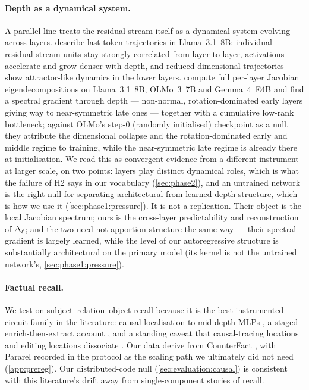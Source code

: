 \paragraph{Depth as a dynamical system.}
A parallel line treats the residual stream itself as a dynamical system
evolving across layers. \citet{fernando2025transformer} describe last-token
trajectories in Llama~3.1~8B: individual residual-stream units stay strongly
correlated from layer to layer, activations accelerate and grow denser with
depth, and reduced-dimensional trajectories show attractor-like dynamics in
the lower layers. \citet{fernando2026dynamics} compute full per-layer Jacobian
eigendecompositions on Llama~3.1~8B, OLMo~3~7B and Gemma~4~E4B and find a
spectral gradient through depth --- non-normal, rotation-dominated early
layers giving way to near-symmetric late ones --- together with a cumulative
low-rank bottleneck; against OLMo's step-0 (randomly initialised) checkpoint
as a null, they attribute the dimensional collapse and the rotation-dominated
early and middle regime to training, while the near-symmetric late regime is
already there at initialisation. We read this as convergent evidence from a
different instrument at larger scale, on two points: layers play distinct
dynamical roles, which is what the failure of H2 says in our vocabulary
(\cref{sec:phase2}), and an untrained network is the right null for
separating architectural from learned depth structure, which is how we use it
(\cref{sec:phase1:pressure}). It is not a replication. Their object is the
local Jacobian spectrum; ours is the cross-layer predictability and
reconstruction of $\Delta_\ell$; and the two need not apportion structure the same
way --- their spectral gradient is largely learned, while the level of our
autoregressive structure is substantially architectural on the primary model
(its kernel is not the untrained network's, \cref{sec:phase1:pressure}).

\paragraph{Factual recall.}
We test on subject--relation--object recall because it is the
best-instrumented circuit family in the literature: causal localisation to
mid-depth MLPs \citep{meng2022rome,dai2022knowledge}, a staged
enrich-then-extract account \citep{geva2023dissecting}, and a standing caveat
that causal-tracing locations and editing locations dissociate
\citep{hase2023does}. Our data derive from CounterFact \citep{meng2022rome},
with Pararel \citep{elazar2021pararel} recorded in the protocol as the scaling
path we ultimately did not need (\cref{app:prereg}). Our distributed-code null
(\cref{sec:evaluation:causal}) is consistent with this literature's drift away
from single-component stories of recall.

